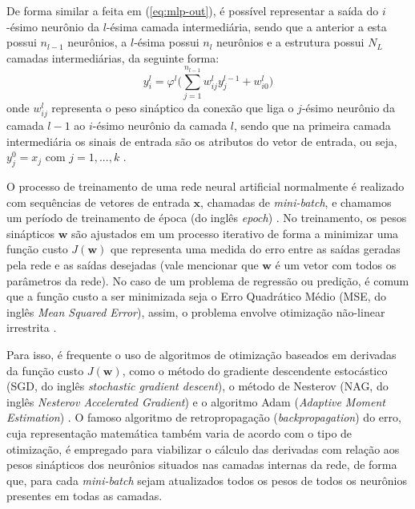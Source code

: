 \documentclass[a4paper, 12pt]{article}
\begin{document}
De forma similar a feita em (\ref{eq:mlp-out}), é possível representar a saída do $i$-ésimo neurônio da $l$-ésima camada intermediária, sendo que a anterior a esta possui $n_{l-1}$ neurônios, a $l$-ésima possui $n_l$ neurônios e a estrutura possui $N_L$ camadas intermediárias, da seguinte forma:
\begin{equation}
	y_{i}^{l} = \varphi^{l} \Big(\sum_{j=1}^{n_{l-1}} w_{ij}^{l} y_{j}^{l-1} + w_{i0}^{l} \Big)
\end{equation}
onde $w_{ij}^{l}$ representa o peso sináptico da conexão que liga o $j$-ésimo neurônio da camada $l-1$ ao $i$-ésimo neurônio da camada $l$, sendo que na primeira camada intermediária os sinais de entrada são os atributos do vetor de entrada, ou seja, $y_{j}^{0} = x_{j}$ com $j = 1, ..., k$ \cite{boccato2013novas}.

O processo de treinamento de uma rede neural artificial normalmente é realizado com sequências de vetores de entrada $\mathbf{x}$, chamadas de \textit{mini-batch}, e chamamos um período de treinamento de época (do inglês \textit{epoch}) \cite{geron2019hands}. No treinamento, os pesos sinápticos $\mathbf{w}$ são ajustados em um processo iterativo de forma a minimizar uma função custo $J(\mathbf{w})$ que representa uma medida do erro entre as saídas geradas pela rede e as saídas desejadas (vale mencionar que $\mathbf{w}$ é um vetor com todos os parâmetros da rede). No caso de um problema de regressão ou predição, é comum que a função custo a ser minimizada seja o Erro Quadrático Médio (MSE, do inglês \textit{Mean Squared Error}), assim, o problema envolve otimização não-linear irrestrita \cite{haykin2010neural}.

Para isso, é frequente o uso de algoritmos de otimização baseados em derivadas da função custo $J(\mathbf{w})$, como o método do gradiente descendente estocástico (SGD, do inglês \textit{stochastic gradient descent}), o método de Nesterov (NAG, do inglês \textit{Nesterov Accelerated Gradient}) e o algoritmo Adam (\textit{Adaptive Moment Estimation}) \cite{geron2019hands}. O famoso algoritmo de retropropagação (\textit{backpropagation}) do erro, cuja representação matemática também varia de acordo com o tipo de otimização, é empregado para viabilizar o cálculo das derivadas com relação aos pesos sinápticos dos neurônios situados nas camadas internas da rede, de forma que, para cada \textit{mini-batch} sejam atualizados todos os pesos de todos os neurônios presentes em todas as camadas. 
\end{document}

